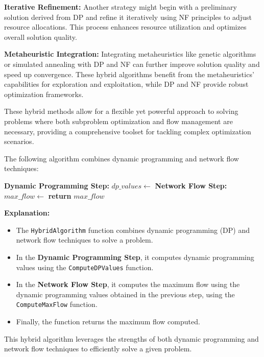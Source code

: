 \documentclass[12pt]{book} %
\begin{document}
\textbf{Iterative Refinement:}
Another strategy might begin with a preliminary solution derived from DP and refine it iteratively using NF principles to adjust resource allocations. This process enhances resource utilization and optimizes overall solution quality.

\textbf{Metaheuristic Integration:}
Integrating metaheuristics like genetic algorithms or simulated annealing with DP and NF can further improve solution quality and speed up convergence. These hybrid algorithms benefit from the metaheuristics' capabilities for exploration and exploitation, while DP and NF provide robust optimization frameworks.

These hybrid methods allow for a flexible yet powerful approach to solving problems where both subproblem optimization and flow management are necessary, providing a comprehensive toolset for tackling complex optimization scenarios.


The following algorithm combines dynamic programming and network flow techniques:
\FloatBarrier
\begin{algorithm}
\caption{Hybrid Algorithm}\label{hybrid-algorithm}
\begin{algorithmic}[1]
    \State \textbf{Dynamic Programming Step:}
    \State $dp\_values \gets$ 
    \State \textbf{Network Flow Step:}
    \State $max\_flow \gets$ 
    \State \textbf{return} $max\_flow$
\EndProcedure
\end{algorithmic}
\end{algorithm}
\FloatBarrier
\textbf{Explanation:}
\begin{itemize}
    \item The \texttt{HybridAlgorithm} function combines dynamic programming (DP) and network flow techniques to solve a problem.
    \item In the \textbf{Dynamic Programming Step}, it computes dynamic programming values using the \texttt{ComputeDPValues} function.
    \item In the \textbf{Network Flow Step}, it computes the maximum flow using the dynamic programming values obtained in the previous step, using the \texttt{ComputeMaxFlow} function.
    \item Finally, the function returns the maximum flow computed.
\end{itemize}

This hybrid algorithm leverages the strengths of both dynamic programming and network flow techniques to efficiently solve a given problem.
\end{document}
